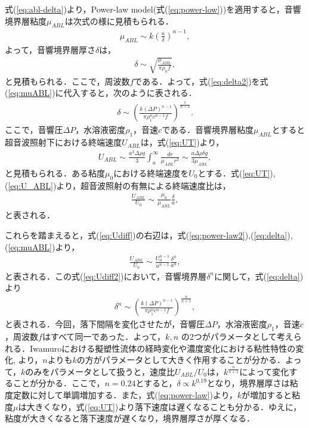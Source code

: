 式(\ref{eq:abl-delta})より，Power-law model(式(\ref{eq:power-low}))を適用すると，音響境界層粘度$\mu_{ABL}$は次式の様に見積もられる．
\begin{eqnarray}
    \mu_{ABL} \sim k\left(\frac{u}{\delta}\right)^{n-1} ,
    \label{eq:muABL}
\end{eqnarray}
よって，音響境界層厚さ$\delta$は，
\begin{eqnarray}
    \delta \sim \sqrt{\frac{\mu_{ABL}}{\pi \rho_h f}} ,
    \label{eq:delta2}
\end{eqnarray}
と見積もられる\cite{deshpande2001vibrational,wiklund2012acoustofluidics}．ここで，周波数$f$である．よって，式(\ref{eq:delta2})を式(\ref{eq:muABL})に代入すると，次のように表される．
\begin{eqnarray}
    \delta \sim \left(\frac{k\left(\Delta P\right)^{n-1}}{\pi \rho^n_1 c^{n-1} f}\right)^{\frac{1}{n+1}} .
    \label{eq:delta}
\end{eqnarray}
ここで，音響圧$\Delta P$，水溶液密度$\rho_1$，音速$c$である．音響境界層粘度$\mu_{ABL}$とすると超音波照射下における終端速度$U_{ABL}$は，式(\ref{eq:UT})より，
\begin{eqnarray}
    U_{ABL} \sim \frac{a^3\Delta\rho g}{3}  \int^{\infty}_{a} \frac{dr}{\mu_{ABL} r^2} \sim \frac{a\Delta \rho \delta g}{3\mu_{ABL}} ,
    \label{eq:U_ABL}
\end{eqnarray}
と見積もられる．ある粘度$\mu_0$における終端速度を$U_0$とする．式(\ref{eq:UT}),(\ref{eq:U_ABL})より，超音波照射の有無による終端速度比は，
\begin{eqnarray}
    \frac{U_{ABL}}{U_0} \sim \frac{\mu_0}{\mu_{ABL}}\frac{\delta}{a} ,
    \label{eq:Udiff}
\end{eqnarray}
と表される．

これらを踏まえると，式(\ref{eq:Udiff})の右辺は，式(\ref{eq:power-law2}),(\ref{eq:delta}),(\ref{eq:muABL})より，
\begin{eqnarray}
    \frac{U_{ABL}}{U_0} \sim \frac{U_0^{n-1}}{u^{n-1}}\frac{\delta^n}{a^n} ,
    \label{eq:Udiff2}
\end{eqnarray}
と表される．この式(\ref{eq:Udiff2})において，音響境界層$\delta^n$に関して，式(\ref{eq:delta})より
\begin{eqnarray}
    \delta^n \sim \left(\frac{k\left(\Delta P\right)^{n-1}}{\pi \rho^n_1 c^{n-1} f}\right)^{\frac{n}{n+1}} ,
    \label{eq:ndelta}
\end{eqnarray}
と表される．今回，落下間隔を変化させたが，音響圧$\Delta P$，水溶液密度$\rho_1$，音速$c$，周波数$f$はすべて同一であった．よって，$k,n$ の2つがパラメータとして考えられる．Iwamuro\cite{ref:9}における擬塑性流体の経時変化や濃度変化における粘性特性の変化\cite{ref:Rahimi2007},\cite{ref:Agi2018} より，$n$よりも$k$の方がパラメータとして大きく作用することが分かる．よって，$k$のみをパラメータとして扱うと，速度比$U_{ABL}/U_0$は，$k^\frac{n}{n+1}$によって変化することが分かる．ここで，$n=0.24$とすると，$\delta \propto k^{0.19}$となり，境界層厚さは粘度定数に対して単調増加する．また，式(\ref{eq:power-law})より，$k$が増加すると粘度$\mu$は大きくなり，式(\ref{eq:UT})より落下速度は遅くなることも分かる．ゆえに，粘度が大きくなると落下速度が遅くなり，境界層厚さが厚くなる．

